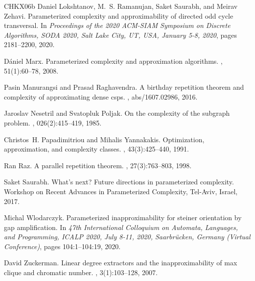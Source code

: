 \documentclass[10pt,a4paper]{article}
\begin{document}
\begin{thebibliography}{CHKX06b}
Daniel Lokshtanov, M.~S. Ramanujan, Saket Saurabh, and Meirav Zehavi.
\newblock Parameterized complexity and approximability of directed odd cycle
  transversal.
\newblock In {\em Proceedings of the 2020 {ACM-SIAM} Symposium on Discrete
  Algorithms, {SODA} 2020, Salt Lake City, UT, USA, January 5-8, 2020}, pages
  2181--2200, 2020.

D{\'a}niel Marx.
\newblock Parameterized complexity and approximation algorithms.
, 51(1):60--78, 2008.

Pasin Manurangsi and Prasad Raghavendra.
\newblock A birthday repetition theorem and complexity of approximating dense
  csps.
, abs/1607.02986, 2016.

Jaroslav Ne{{s}}et{{r}}il and Svatopluk Poljak.
\newblock On the complexity of the subgraph problem.
,
  026(2):415--419, 1985.

Christos~H. Papadimitriou and Mihalis Yannakakis.
\newblock Optimization, approximation, and complexity classes.
, 43(3):425--440, 1991.

Ran Raz.
\newblock A parallel repetition theorem.
, 27(3):763--803, 1998.

Saket Saurabh.
\newblock What’s next? {Future} directions in parameterized complexity.
\newblock Workshop on Recent Advances in Parameterized Complexity, {Tel-Aviv},
  {Israel}, 2017.

Michal Wlodarczyk.
\newblock Parameterized inapproximability for steiner orientation by gap
  amplification.
\newblock In {\em 47th International Colloquium on Automata, Languages, and
  Programming, {ICALP} 2020, July 8-11, 2020, Saarbr{\"{u}}cken, Germany
  (Virtual Conference)}, pages 104:1--104:19, 2020.

David Zuckerman.
\newblock Linear degree extractors and the inapproximability of max clique and
  chromatic number.
, 3(1):103--128, 2007.

\end{thebibliography}
\end{document}
